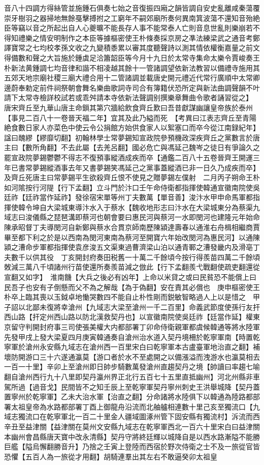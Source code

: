 音八十四調方得絲管並施鍾石俱奏七始之音復振四廂之韻皆調自安史亂離咸秦蕩覆崇牙樹羽之器掃地無餘戞擊搏拊之工窮年不嗣郊廟所奏何異南箕波蕩不還知音殆絶臣等竊以音之所起出自人心夔曠不能長存人事不能常泰人亡則音息世亂則樂崩若不得知禮樂之情安明制作之本臣等據樞密使王朴條奏採京房之凖法練梁武之通音考鄭譯寶常之七均校孝孫文收之九變積黍累以審其度聽聲詩以測其情依權衡嘉量之前文得備數和聲之大旨施於鍾虡足洽簫韶臣等今月十九日於太常寺集命太樂令賈峻奏王朴新法黄鍾調七均音律和諧不相凌越其餘十一管諸調望依新法教習以備禮寺施用其五郊天地宗廟社稷三廟大禮合用十二管諸調並載唐史開元禮近代常行廣順中太常卿邊蔚奉勅定前件祠祭朝會舞名樂曲歌詞寺司合有簿籍伏恐所定與新法曲調聲韻不叶請下太常寺檢詳校試若或乖舛請本寺依新法聲調别撰樂章舞曲令歌者誦習從之】　唐宋齊丘至九華山唐主命鎻其第穴牆給飲食齊丘歎曰吾昔獻謀幽讓皇帝族於泰州【事見二百八十一卷晉天福二年】宜其及此乃縊而死　【考異曰江表志齊丘至青陽絶食數日家人亦菜色中使云令公捐館方始供食家人以絮塞口而卒今從江南録紀年】諡曰醜繆【繆靡切翻】初翰林學士常夢錫知宣政院參預機政深疾齊丘之黨數言於唐主曰【數所角翻】不去此屬【去羌呂翻】國必危亡與馮延己魏岑之徒日有爭論久之罷宣政院夢錫鬱鬱不得志不復預事縱酒成疾而卒【通鑑二百八十五卷晉齊王開運三年已書常夢錫縱酒事去年又書夢錫笑馮延己之黨事蓋縱酒已非一日久乃成疾而卒】及齊丘死唐主曰常夢錫平生欲殺齊丘恨不使見之贈夢錫左僕射　二月丙子朔命王朴如河隂按行河隄【行下孟翻】立斗門於汴口壬午命侍衛都指揮使韓通宣徽南院使吳廷祚【廷祚當作延祚】發徐宿宋單等州丁夫數萬【單音善】浚汴水甲申命馬軍都指揮使韓令坤自大梁城東導汴水入于蔡水【魏收地形志曰汴水在大梁城東分為蔡渠九域志曰浚儀縣之琵琶溝即蔡河也朝會要曰惠民河與蔡河一水即閔河也建隆元年始命陳承昭督丁夫導閔河自新鄭與蔡水合貫京師南歷陳潁達壽春以通淮右舟楫相繼商賈畢至都下利之於是以西南為閔河東南為蔡河至開寶六年始改閔河為惠民河】以通陳潁之漕命步軍都指揮使袁彦浚五文渠東過曹濟梁山泊以通青鄆之漕發畿内及滑亳丁夫數千以供其役　丁亥開封府奏田税舊一十萬二千餘頃今按行得羨苗四萬二千餘頃敇減三萬八千頃諸州行苗使還所奏羨苗減之倣此【行下孟翻羨弋戰翻使疏吏翻還從宣翻又如字】　淮南饑【大兵之後必有凶年】上命以米貸之或曰民貧恐不能償上曰民吾子也安有子倒懸而父不為之解哉【為于偽翻】安在責其必償也　庚申樞密使王朴卒上臨其喪以玉鉞卓地慟哭數四不能自止朴性剛而鋭敏智略過人上以是惜之　甲子詔以北鄙未復將幸滄州【九域志大梁至滄州一千二百里】命義武節度使孫行友扞西山路【扞定州西山路以防北漢救契丹也】以宣徽南院使吳廷祚【廷當作延】權東京留守判開封府事三司使張美權大内都部署丁卯命侍衛親軍都虞候韓通等將水陸軍先發甲戌上發大梁夏四月庚寅韓通奏自滄州治水道入契丹境柵於乾寧軍南【時置乾寧軍於滄州永安縣九域志在滄州西一百里宋白曰乾寧軍本古盧臺軍地治直之翻】補壞防開游口三十六遂通瀛莫【游口者於水不至處開之以備漲溢而洩游水也瀛莫相去一百一十里】辛卯上至滄州即日帥步騎數萬發滄州直趨契丹之境【帥讀曰率趨七喻翻自滄州西行九十八里即契丹瀛州界正北行五百七十五里直抵幽州】河北州縣非車駕所過【過音戈】民間皆不之知壬辰上至乾寧軍契丹寧州刺史王洪舉城降【契丹蓋置寧州於乾寧軍】乙未大治水軍【治直之翻】分命諸將水陸俱下以韓通為陸路都部署太祖皇帝為水路都部署丁酉上御龍舟沿流而北舳艫相連數十里己亥至獨流口【九域志獨流口在乾寧軍北一百二十里金人疆域圖涿州管下固安縣有獨流村】泝流而西辛丑至益津關【益津關在莫州文安縣九域志在乾寧軍西北一百六十里宋白曰益津關本幽州會昌縣唐天寶中改永清縣】契丹守將終廷輝以城降自是以西水路漸隘不能勝巨艦【隘烏懈翻勝音升】乃捨之壬寅上登陸而西宿於野次侍衛之士不及一旅從官皆恐懼【五百人為一旅從才用翻】胡騎連羣出其左右不敢逼癸卯太祖皇